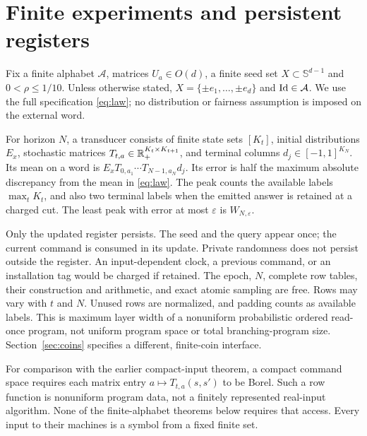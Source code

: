 \section{Finite experiments and persistent registers}\label{sec:model}
Fix a finite alphabet $\mathcal A$, matrices $U_a\in O(d)$, a finite seed
set $X\subset\mathbb S^{d-1}$ and $0<\rho\le1/10$. Unless otherwise
stated, $X=\{\pm e_1,\ldots,\pm e_d\}$ and $\operatorname{Id}\in\mathcal A$.
We use the full specification \eqref{eq:law}; no distribution or fairness
assumption is imposed on the external word.

\begin{definition}
\label{def:machine}
For horizon $N$, a transducer consists of finite state sets $[K_t]$,
initial distributions $E_x$, stochastic matrices
$T_{t,a}\in\mathbb R_+^{K_t\times K_{t+1}}$, and terminal columns
$d_j\in[-1,1]^{K_N}$. Its mean on a word is
$E_xT_{0,a_1}\cdots T_{N-1,a_N}d_j$.
Its error is half the maximum absolute discrepancy from the mean in
\eqref{eq:law}. The peak counts the available labels $\max_tK_t$,
and also two terminal labels when the emitted answer is retained at a
charged cut. The least peak with error at most $\varepsilon$ is
$W_{N,\varepsilon}$.
\end{definition}

Only the updated register persists. The seed and the query appear once;
the current command is consumed in its update. Private randomness does
not persist outside the register. An input-dependent clock, a previous
command, or an installation tag would be charged if retained.
The epoch, $N$, complete row tables, their construction and arithmetic,
and exact atomic sampling are free. Rows may vary with $t$ and $N$.
Unused rows are normalized, and padding counts as available labels.
This is maximum layer width of a nonuniform probabilistic ordered
read-once program, not uniform program space or total branching-program
size. Section~\ref{sec:coins} specifies a different, finite-coin interface.

For comparison with the earlier compact-input theorem, a compact command
space requires each matrix entry $a\mapsto T_{t,a}(s,s')$ to be Borel.
Such a row function is nonuniform program data, not a finitely represented
real-input algorithm. None of the finite-alphabet theorems below requires
that access. Every input to their machines is a symbol from a fixed
finite set.

